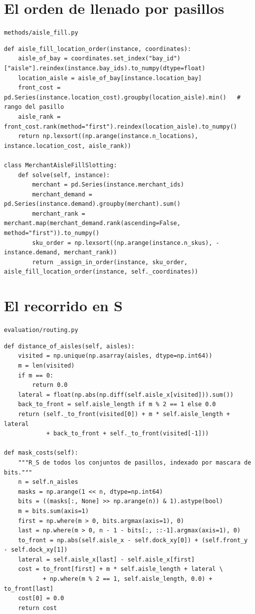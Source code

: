 \documentclass[11pt,a4paper,oneside]{report}
\newcommand{\code}[1]{\texttt{\small #1}}
\begin{document}
\section{El orden de llenado por pasillos}
\code{methods/aisle\_fill.py}
\begin{lstlisting}
def aisle_fill_location_order(instance, coordinates):
    aisle_of_bay = coordinates.set_index("bay_id")["aisle"].reindex(instance.bay_ids).to_numpy(dtype=float)
    location_aisle = aisle_of_bay[instance.location_bay]
    front_cost = pd.Series(instance.location_cost).groupby(location_aisle).min()   # rango del pasillo
    aisle_rank = front_cost.rank(method="first").reindex(location_aisle).to_numpy()
    return np.lexsort((np.arange(instance.n_locations), instance.location_cost, aisle_rank))

class MerchantAisleFillSlotting:
    def solve(self, instance):
        merchant = pd.Series(instance.merchant_ids)
        merchant_demand = pd.Series(instance.demand).groupby(merchant).sum()
        merchant_rank = merchant.map(merchant_demand.rank(ascending=False, method="first")).to_numpy()
        sku_order = np.lexsort((np.arange(instance.n_skus), -instance.demand, merchant_rank))
        return _assign_in_order(instance, sku_order, aisle_fill_location_order(instance, self._coordinates))
\end{lstlisting}

\section{El recorrido en S}
\code{evaluation/routing.py}
\begin{lstlisting}
def distance_of_aisles(self, aisles):
    visited = np.unique(np.asarray(aisles, dtype=np.int64))
    m = len(visited)
    if m == 0:
        return 0.0
    lateral = float(np.abs(np.diff(self.aisle_x[visited])).sum())
    back_to_front = self.aisle_length if m % 2 == 1 else 0.0
    return (self._to_front(visited[0]) + m * self.aisle_length + lateral
            + back_to_front + self._to_front(visited[-1]))

def mask_costs(self):
    """R_S de todos los conjuntos de pasillos, indexado por mascara de bits."""
    n = self.n_aisles
    masks = np.arange(1 << n, dtype=np.int64)
    bits = ((masks[:, None] >> np.arange(n)) & 1).astype(bool)
    m = bits.sum(axis=1)
    first = np.where(m > 0, bits.argmax(axis=1), 0)
    last = np.where(m > 0, n - 1 - bits[:, ::-1].argmax(axis=1), 0)
    to_front = np.abs(self.aisle_x - self.dock_xy[0]) + (self.front_y - self.dock_xy[1])
    lateral = self.aisle_x[last] - self.aisle_x[first]
    cost = to_front[first] + m * self.aisle_length + lateral \
           + np.where(m % 2 == 1, self.aisle_length, 0.0) + to_front[last]
    cost[0] = 0.0
    return cost
\end{lstlisting}
\end{document}
